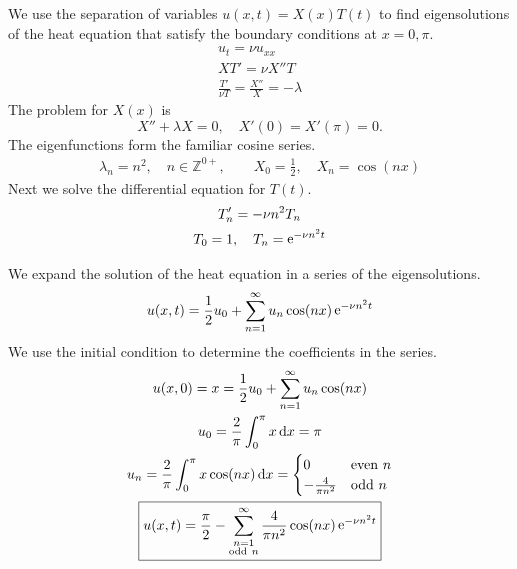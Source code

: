 {\begin{Solution}
  \label{solution ut=nuuxx ux=ux=0}
  We use the separation of variables $u(x,t) = X(x) T(t)$ to find
  eigensolutions of the heat equation that satisfy the boundary
  conditions at $x = 0, \pi$.
  \begin{gather*}
    u_t = \nu u_{x x}
    \\
    X T' = \nu X'' T
    \\
    \frac{T'}{\nu T} = \frac{X''}{X} = - \lambda
  \end{gather*}
  The problem for $X(x)$ is
  \[
  X'' + \lambda X = 0, \quad X'(0) = X'(\pi) = 0.
  \]
  The eigenfunctions form the familiar cosine series.
  \begin{gather*}
    \lambda_n = n^2, \quad n \in \mathbb{Z}^{0+}, \qquad
    X_0 = \frac{1}{2}, \quad X_n = \cos(n x)
  \end{gather*}
  Next we solve the differential equation for $T(t)$.
  \begin{gather*}
    T_n' = - \nu n^2 T_n
    \\
    T_0 = 1, \quad T_n = \mathop{\mathrm{e}}\nolimits^{-\nu n^2 t}
  \end{gather*}

  We expand the solution of the heat equation in a series of the eigensolutions.
  \[
  u(x,t) = \frac{1}{2} u_0 + \sum_{n = 1}^\infty u_n \cos(n x) \mathop{\mathrm{e}}\nolimits^{-\nu n^2 t}
  \]
  We use the initial condition to determine the coefficients in the series.
  \begin{gather*}
    u(x,0) = x = \frac{1}{2} u_0 + \sum_{n = 1}^\infty u_n \cos(n x)
    \\
    u_0 = \frac{2}{\pi} \int_0^\pi x \,\mathrm{d} x = \pi
    \\
    u_n = \frac{2}{\pi} \int_0^\pi x \cos(n x) \,\mathrm{d} x = 
    \begin{cases}
      0 &\mathrm{even}\ n \\
      - \frac{4}{\pi n^2} &\mathrm{odd}\ n
    \end{cases}
    \\
    \boxed{
      u(x,t) = \frac{\pi}{2} 
      - \sum_{\substack{n = 1 \\ \mathrm{odd}\ n}}^\infty \frac{4}{\pi n^2} \cos(n x) \mathop{\mathrm{e}}\nolimits^{-\nu n^2 t}
      }
  \end{gather*}
\end{Solution}







}
